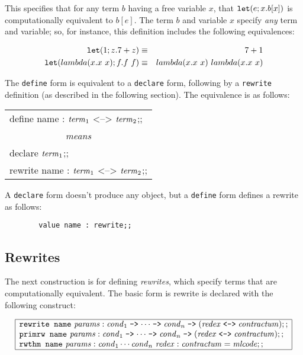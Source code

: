 \documentclass{article}
\newcommand\ttmetarightarrow{\mathrel{\hbox{\tt -->}}}
\newcommand\ttmetaleftrightarrow{\mathrel{\hbox{\tt <-->}}}
\newcommand\syntax{\noindent{\bf Syntax}\makebox[1in]{\dotfill}\rule[-1em]{0em}{3em}\par\noindent}
\newcommand\mlsemantics{\noindent{\bf ML Definitions}\makebox[1in]{\dotfill}\rule[-1em]{0em}{3em}\par\noindent}
\begin{document}
This specifies that for any term $b$ having a free variable $x$, that ${\tt let}(e; x. b[x])$ is
computationally equivalent to $b[e]$.  The term $b$ and variable $x$ specify {\em
  any\/} term and variable; so, for instance, this definition includes the following equivalences:

\begin{eqnarray*}
{\tt let}(1; z. 7 + z) & \equiv & 7 + 1\cr
{\tt let}(lambda(x. x\ x); f. f\ f) & \equiv & lambda(x. x\ x)\ lambda(x. x\ x)
\end{eqnarray*}

The {\tt define} form is equivalent to a {\tt declare} form, following by a {\tt rewrite} definition
(as described in the following section).  The equivalence is as follows:

\begin{center}
  {\tt \begin{tabular}{|l|}
    \hline
    define name : ${\it term}_1$ <--> ${\it term}_2$;;\\
    \multicolumn{1}{|c|}{{\it means}}\\
    declare ${\it term}_1$;;\\
    rewrite name : ${\it term}_1$ <--> ${\it term}_2$;;\\
    \hline
  \end{tabular}}
\end{center}

\mlsemantics
A {\tt declare} form doesn't produce any object, but a {\tt define} form defines a rewrite as
follows:
\begin{verbatim}
        value name : rewrite;;
\end{verbatim}

\subsection{Rewrites}

The next construction is for defining {\em rewrites}, which specify terms that are computationally
equivalent.  The basic form is rewrite is declared with the following construct:

\syntax
$$
\begin{array}{|l|}
\hline
\hbox{\tt rewrite name}\ {\it params} : {\it cond}_1 \ttmetarightarrow \cdots \ttmetarightarrow
  {\it cond}_n \ttmetarightarrow ({\it redex} \ttmetaleftrightarrow {\it contractum});;\\
\hbox{\tt primrw name}\ {\it params} : {\it cond}_1 \ttmetarightarrow \cdots \ttmetarightarrow
  {\it cond}_n \ttmetarightarrow ({\it redex} \ttmetaleftrightarrow {\it contractum});;\\
\hbox{\tt rwthm name}\ {\it params} : {\it cond}_1 \cdots {\it cond}_n\ {\it redex} : {\it contractum} = {\it mlcode};;\\
\hline
\end{array}
$$
\end{document}
